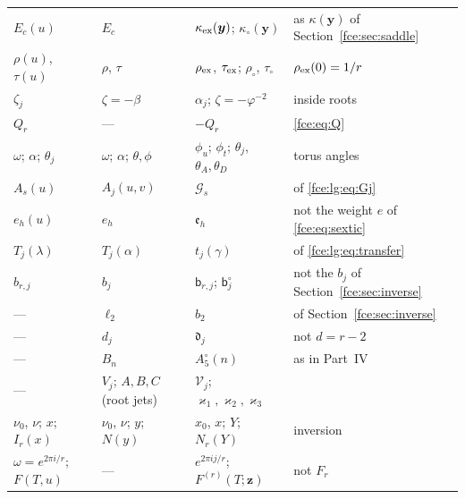 \documentclass[11pt,a4paper]{article}
\numberwithin{equation}{section}
\theoremstyle{definition}\newtheorem{definition}[theorem]{Definition}
\theoremstyle{remark}\newtheorem{remark}[theorem]{Remark}
\begin{document}
{\begin{longtable}{@{}>{\raggedright\arraybackslash}p{}>{\raggedright\arraybackslash}p{}>{\raggedright\arraybackslash}p{}>{\raggedright\arraybackslash}p{}@{}}
$E_c(u)$ & $E_c$ & $\kappa_{\rm ex}(\boldsymbol y)$; $\kappa_\circ(\boldsymbol y)$ & as $\kappa(\boldsymbol y)$ of Section~\ref{fce:sec:saddle}\\
$\rho(u)$, $\tau(u)$ & $\rho$, $\tau$ & $\rho_{\rm ex}$, $\tau_{\rm ex}$; $\rho_\circ$, $\tau_\circ$ & $\rho_{\rm ex}(0)=1/r$\\
$\zeta_j$ & $\zeta=-\beta$ & $\alpha_j$; $\zeta=-\varphi^{-2}$ & inside roots\\
$Q_r$ & --- & $-Q_r$ & \eqref{fce:eq:Q}\\
$\omega$; $\alpha$; $\theta_j$ & $\omega$; $\alpha$; $\theta,\phi$ & $\phi_u$; $\phi_t$; $\theta_j$, $\theta_A,\theta_D$ & torus angles\\
$A_s(u)$ & $A_j(u,v)$ & $\mathcal G_s$ & of \eqref{fce:lg:eq:Gj}\\
$e_h(u)$ & $e_h$ & $\mathfrak e_h$ & not the weight $e$ of \eqref{fce:eq:sextic}\\
$T_j(\lambda)$ & $T_j(\alpha)$ & $t_j(\gamma)$ & of \eqref{fce:lg:eq:transfer}\\
$b_{r,j}$ & $b_j$ & $\mathsf b_{r,j}$; $\mathsf b^\circ_j$ & not the $b_j$ of Section~\ref{fce:sec:inverse}\\
--- & $\ell_2$ & $b_2$ & of Section~\ref{fce:sec:inverse}\\
--- & $d_j$ & $\mathfrak d_j$ & not $d=r-2$\\
--- & $B_n$ & $A^\circ_5(n)$ & as in Part~IV\\
--- & $V_j$; $A,B,C$ (root jets) & $\mathcal V_j$; $\varkappa_1,\varkappa_2,\varkappa_3$ & \\
$\nu_0$, $\nu$; $x$; $I_r(x)$ & $\nu_0$, $\nu$; $y$; $N(y)$ & $x_0$, $x$; $Y$; $N_r(Y)$ & inversion\\
$\omega=e^{2\pi i/r}$; $F(T,u)$ & --- & $e^{2\pi ij/r}$; $F^{(r)}(T;\boldsymbol z)$ & not $F_r$\\
\end{longtable}}
\end{document}
